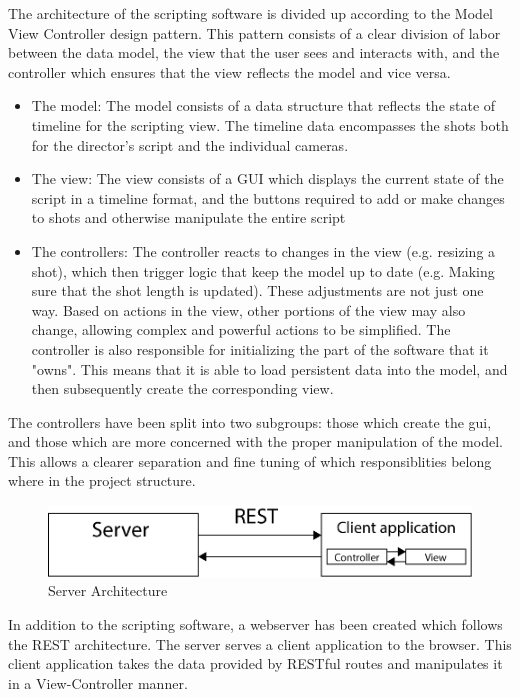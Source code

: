\documentclass[11pt,twoside,a4paper]{article}
\begin{document}
The architecture of the scripting software is divided up according to the Model View Controller design pattern. This pattern consists of a clear division of labor between the data model, the view that the user sees and interacts with, and the controller which ensures that the view reflects the model and vice versa.
\begin{itemize}
    \item The model: The model consists of a data structure that reflects the state of timeline for the scripting view. The timeline data encompasses the shots both for the director's script and the individual cameras.
    \item The view: The view consists of a GUI which displays the current state of the script in a timeline format, and the buttons required to add or make changes to shots and otherwise manipulate the entire script
    \item The controllers: The controller reacts to changes in the view (e.g. resizing a shot), which then trigger logic that keep the model up to date (e.g. Making sure that the shot length is updated). These adjustments are not just one way. Based on actions in the view, other portions of the view may also change, allowing complex and powerful actions to be simplified. The controller is also responsible for initializing the part of the software that it "owns". This means that it is able to load persistent data into the model, and then subsequently create the corresponding view.
\end{itemize}
The controllers have been split into two subgroups: those which create the gui, and those which are more concerned with the proper manipulation of the model. This allows a clearer separation and fine tuning of which responsiblities belong where in the project structure.\\
\begin{figure}[H]
	\centering
	\includegraphics[width=\textwidth]{server-decomposition}
	\caption{Server Architecture}
	\label{fig:archdecomp}
\end{figure}
In addition to the scripting software, a webserver has been created which follows the REST architecture. The server serves a client application to the browser. This client application takes the data provided by RESTful routes and manipulates it in a View-Controller manner.
\end{document}
